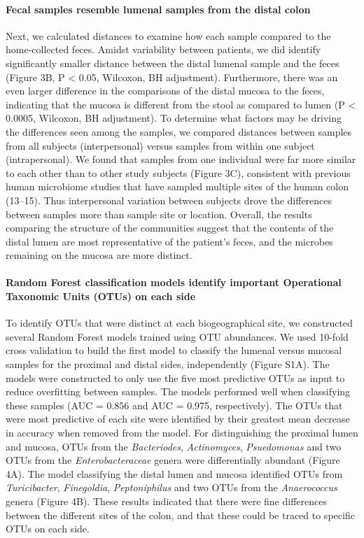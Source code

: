 \documentclass[11pt,]{article}
\let\oldparagraph\paragraph
\renewcommand{\paragraph}[1]{\oldparagraph{#1}\mbox{}}
\begin{document}
\paragraph{Fecal samples resemble lumenal samples from the distal
colon}\label{fecal-samples-resemble-lumenal-samples-from-the-distal-colon}

Next, we calculated distances to examine how each sample compared to the
home-collected feces. Amidst variability between patients, we did
identify significantly smaller distance between the distal lumenal
sample and the feces (Figure 3B, P \textless{} 0.05, Wilcoxon, BH
adjustment). Furthermore, there was an even larger difference in the
comparisons of the distal mucosa to the feces, indicating that the
mucosa is different from the stool as compared to lumen (P \textless{}
0.0005, Wilcoxon, BH adjustment). To determine what factors may be
driving the differences seen among the samples, we compared distances
between samples from all subjects (interpersonal) versus samples from
within one subject (intrapersonal). We found that samples from one
individual were far more similar to each other than to other study
subjects (Figure 3C), consistent with previous human microbiome studies
that have sampled multiple sites of the human colon (13--15). Thus
interpersonal variation between subjects drove the differences between
samples more than sample site or location. Overall, the results
comparing the structure of the communities suggest that the contents of
the distal lumen are most representative of the patient's feces, and the
microbes remaining on the mucosa are more distinct.

\paragraph{Random Forest classification models identify important
Operational Taxonomic Units (OTUs) on each
side}\label{random-forest-classification-models-identify-important-operational-taxonomic-units-otus-on-each-side}

To identify OTUs that were distinct at each biogeographical site, we
constructed several Random Forest models trained using OTU abundances.
We used 10-fold cross validation to build the first model to classify
the lumenal versus mucosal samples for the proximal and distal sides,
independently (Figure S1A). The models were constructed to only use the
five most predictive OTUs as input to reduce overfitting between
samples. The models performed well when classifying these samples (AUC =
0.856 and AUC = 0.975, respectively). The OTUs that were most predictive
of each site were identified by their greatest mean decrease in accuracy
when removed from the model. For distinguishing the proximal lumen and
mucosa, OTUs from the \emph{Bacteriodes}, \emph{Actinomyces},
\emph{Psuedomonas} and two OTUs from the \emph{Enterobacteraceae} genera
were differentially abundant (Figure 4A). The model classifying the
distal lumen and mucosa identified OTUs from \emph{Turicibacter},
\emph{Finegoldia}, \emph{Peptoniphilus} and two OTUs from the
\emph{Anaerococcus} genera (Figure 4B). These results indicated that
there were fine differences between the different sites of the colon,
and that these could be traced to specific OTUs on each side.
\end{document}
